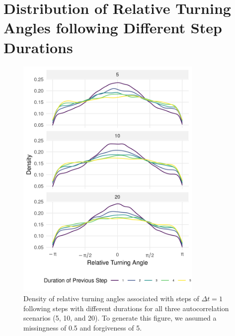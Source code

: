 \documentclass[../FinalThesis.tex]{subfiles}
\begin{document}
\section{Distribution of Relative Turning Angles following Different Step Durations}
\begin{figure}[!ht]
  \begin{center}
  \includegraphics[width = 0.8\textwidth]{Figures/TurningAnglePreviousDuration.png}
  \caption{Density of relative turning angles associated with steps of $\Delta t
  = 1$ following steps with different durations for all three autocorrelation
  scenarios (5, 10, and 20). To generate this figure, we assumed a missingness
  of 0.5 and forgiveness of 5.}
  \label{PreviousDuration}
  \end{center}
\end{figure}

\newpage
\end{document}
